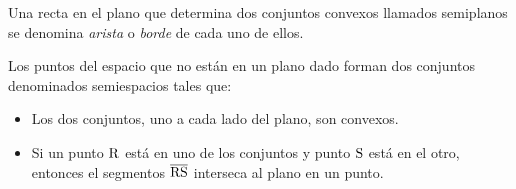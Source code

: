\begin{definition}
    Una recta en el plano que determina dos conjuntos convexos llamados semiplanos se denomina \textit{arista} o \textit{borde} de cada uno de ellos.

    \begin{figure}[!h]
        \centering
        
        \label{fig:arista}
    \end{figure}
    
\end{definition}

\begin{postulate}
    Los puntos del espacio que no están en un plano dado forman dos conjuntos denominados semiespacios tales que:

    \begin{itemize}
        \item Los dos conjuntos, uno a cada lado del plano, son convexos.
        \item Si un punto $\rm R$ está en uno de los conjuntos y punto $\rm S$ está en el otro, entonces el segmentos $\overline{\rm RS}$ interseca al plano en un punto.
    \end{itemize}
\end{postulate}
